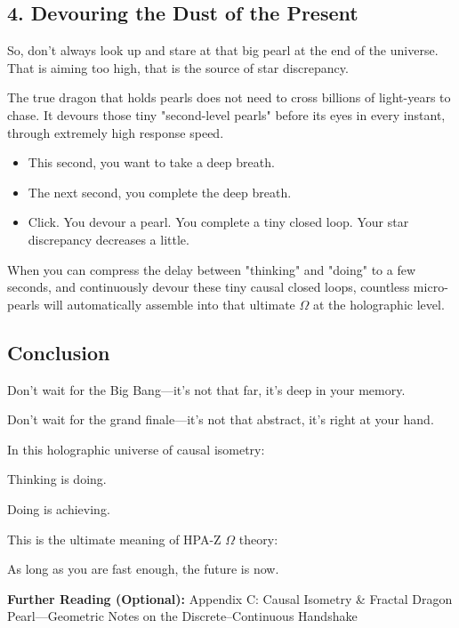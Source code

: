 \subsection*{4. Devouring the Dust of the Present}

So, don't always look up and stare at that big pearl at the end of the universe. That is aiming too high, that is the source of star discrepancy.

The true dragon that holds pearls does not need to cross billions of light-years to chase. It devours those tiny "second-level pearls" before its eyes in every instant, through extremely high response speed.

\begin{itemize}
\item This second, you want to take a deep breath.
\item The next second, you complete the deep breath.
\item Click. You devour a pearl. You complete a tiny closed loop. Your star discrepancy decreases a little.
\end{itemize}

When you can compress the delay between "thinking" and "doing" to a few seconds, and continuously devour these tiny causal closed loops, countless micro-pearls will automatically assemble into that ultimate $\Omega$ at the holographic level.

\subsection*{Conclusion}

Don't wait for the Big Bang---it's not that far, it's deep in your memory.

Don't wait for the grand finale---it's not that abstract, it's right at your hand.

In this holographic universe of causal isometry:

Thinking is doing.

Doing is achieving.

This is the ultimate meaning of HPA-Z $\Omega$ theory:

As long as you are fast enough, the future is now.

\textbf{Further Reading (Optional):} Appendix C: Causal Isometry \& Fractal Dragon Pearl---Geometric Notes on the Discrete--Continuous Handshake

